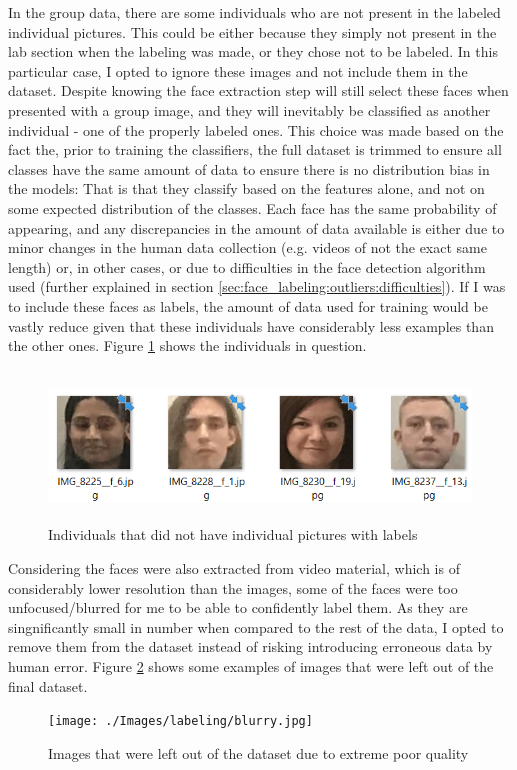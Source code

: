 \documentclass[11pt]{article}
\begin{document}
            In the group data, there are some individuals who are not present in the labeled individual pictures. This could be either because they simply not present in the lab section when the labeling was made, or they chose not to be labeled. In this particular case, I opted to ignore these images and not include them in the dataset. Despite knowing the face extraction step will still select these faces when presented with a group image, and they will inevitably be classified as another individual - one of the properly labeled ones. This choice was made based on the fact the, prior to training the classifiers, the full dataset is trimmed to ensure all classes have the same amount of data to ensure there is no distribution bias in the models: That is that they classify based on the features alone, and not on some expected distribution of the classes. Each face has the same probability of appearing, and any discrepancies in the amount of data available is either due to minor changes in the human data collection (e.g. videos of not the exact same length) or, in other cases, or due to difficulties in the face detection algorithm used (further explained in section \ref{sec:face_labeling:outliers:difficulties}). If I was to include these faces as labels, the amount of data used for training would be vastly reduce given that these individuals have considerably less examples than the other ones. Figure \ref{fig:label:unlabeled_inds} shows the individuals in question.
            \begin{figure}[ht]
                \centering
                \includegraphics[height=4cm]{./Images/labeling/unlabeled_inds.png}
                \caption{Individuals that did not have individual pictures with labels}
                \label{fig:label:unlabeled_inds}
            \end{figure}

            Considering the faces were also extracted from video material, which is of considerably lower resolution than the images, some of the faces were too unfocused/blurred for me to be able to confidently label them. As they are singnificantly small in number when compared to the rest of the data, I opted to remove them from the dataset instead of risking introducing erroneous data by human error. Figure \ref{fig:label:blurry} shows some examples of images that were left out of the final dataset.
            \begin{figure}[ht]
                \centering
                \texttt{[image: ./Images/labeling/blurry.jpg]}
                \caption{Images that were left out of the dataset due to extreme poor quality}
                \label{fig:label:blurry}
            \end{figure}
\end{document}
